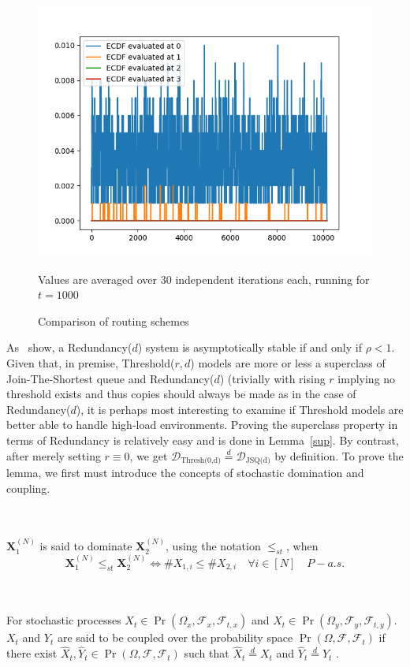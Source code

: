 \begin{figure}
    \centering
    \includegraphics[width=0.7\linewidth]{attimes} %
    \caption{Comparison of routing schemes}
    \medskip
    Values are averaged over 30 independent iterations each, running for $t=1000$
    \label{fig:img}
\end{figure}

As~\cite{gardner_redundancy-d_2017} show, a Redundancy($d$) system is asymptotically stable if and only if $\rho < 1 $. Given that, in premise, Threshold($r,d$) models are more or less a superclass of Join-The-Shortest queue and Redundancy($d$) (trivially with rising $r$  implying no threshold exists and thus copies should always be made as in the case of Redundancy($d$), it is perhaps most interesting to examine if Threshold models are better able to handle high-load environments. Proving the superclass property in terms of Redundancy is relatively easy and is done in Lemma~\ref{sup}. By contrast, after merely setting $r \equiv 0$, we get $ \mathcal{D}_{\text{Thresh(0,d)}} \overset{d}{=} \mathcal{D}_{\text{JSQ(d)}}$ by definition. To prove the lemma, we first must introduce the concepts of stochastic domination and coupling.
\begin{definition}
    \\~\\
    $\mathbf{X}_{1}^{(N)}$ is said to dominate $\mathbf{X}_{2}^{(N)}$, using the notation $\leq_{st}$, when ~\cite{bramson_asymptotic_2012}
    \[\mathbf{X}_{1}^{(N)}\leq_{st}\mathbf{X}_{2}^{(N)} \iff\# X_{1,i} \leq \# X_{2,i}  \quad \forall i \in [N] \quad P-a.s.\]
\end{definition}

\begin{definition}
    \label{coupled}
    \\~\\
    For stochastic processes $X_{t} \in \Pr(\Omega_{x}, \mathcal{F}_{x}, \mathcal{F}_{t,x})$ and $X_{t} \in \Pr(\Omega_{y}, \mathcal{F}_{y}, \mathcal{F}_{t,y})$.
    $X_{t}$ and $Y_{t}$ are said to be coupled over the probability space $\Pr(\Omega, \mathcal{F}, \mathcal{F}_{t})$ if there exist
    $\hat X_{t}, \hat Y_{t} \in \Pr(\Omega, \mathcal{F}, \mathcal{F}_{t})$ such that $\hat X_{t} \overset{d}{=}X_{t}$ and $\hat Y_{t} \overset{d}{=}Y_{t}$ \cite{bramson_asymptotic_2012}.
\end{definition}

